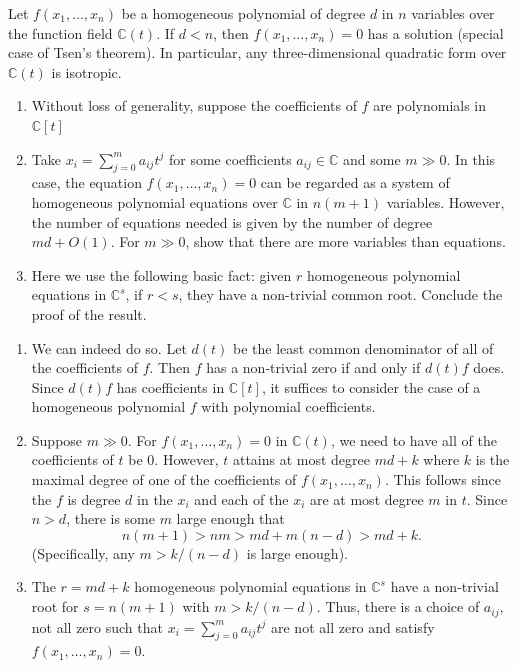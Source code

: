 \documentclass[12 pt, letterpaper]{hmcpset}
\begin{document}
\begin{problem}[(2)]
	Let $f(x_{1}, \dots, x_{n})$ be a homogeneous polynomial of degree $d$ in $n$ variables over the function field $\mathbb{C}(t)$. If $d < n$, then $f(x_{1}, \dots, x_{n}) = 0$ has a solution (special case of Tsen's theorem). In particular, any three-dimensional quadratic form over $\mathbb{C}(t)$ is isotropic.
	\begin{enumerate}
		\item Without loss of generality, suppose the coefficients of $f$ are polynomials in $\mathbb{C}[t]$ 

		\item Take $x_{i} = \sum_{j = 0}^{m} a_{ij} t^{j}$ for some coefficients $a_{ij} \in \mathbb{C}$ and some $m \gg 0$. In this case, the equation $f(x_{1}, \dots, x_{n}) = 0$ can be regarded as a system of homogeneous polynomial equations over $\mathbb{C}$ in  $n(m + 1)$ variables. However, the number of equations needed is given by the number of degree $md + O(1)$. For $m \gg 0$, show that there are more variables than equations.

		\item Here we use the following basic fact: given $r$ homogeneous polynomial equations in $\mathbb{C}^{s}$, if $r < s$, they have a non-trivial common root. Conclude the proof of the result.
	\end{enumerate}
\end{problem}

\begin{solution}
	\begin{enumerate}
		\item We can indeed do so. Let $d(t)$ be the least common denominator of all of the coefficients of $f$. Then $f$ has a non-trivial zero if and only if $d(t) f$ does. Since $d(t) f$ has coefficients in $\mathbb{C}[t]$, it suffices to consider the case of a homogeneous polynomial $f$ with polynomial coefficients.

		\item Suppose $m \gg 0$. For $f(x_{1}, \dots, x_{n}) = 0$ in $\mathbb{C}(t)$, we need to have all of the coefficients of $t$ be $0$. However, $t$ attains at most degree $md + k$ where $k$ is the maximal degree of one of the coefficients of $f(x_{1}, \dots, x_{n})$. This follows since the $f$ is degree $d$ in the $x_{i}$ and each of the $x_{i}$ are at most degree $m$ in $t$. Since $n > d$, there is some $m$ large enough that
			\[
				n(m + 1) > nm > md + m(n - d) > md + k.
			\]
			(Specifically, any $m > k / (n - d)$ is large enough).

		\item The $r = md + k$ homogeneous polynomial equations in $\mathbb{C}^{s}$ have a non-trivial root for $s = n(m + 1)$ with $m > k / (n - d)$. Thus, there is a choice of $a_{ij}$, not all zero such that $x_{i} = \sum_{j = 0}^{m} a_{ij} t^{j}$ are not all zero and satisfy $f(x_{1}, \dots, x_{n}) = 0$.
	\end{enumerate}
\end{solution}
\end{document}
